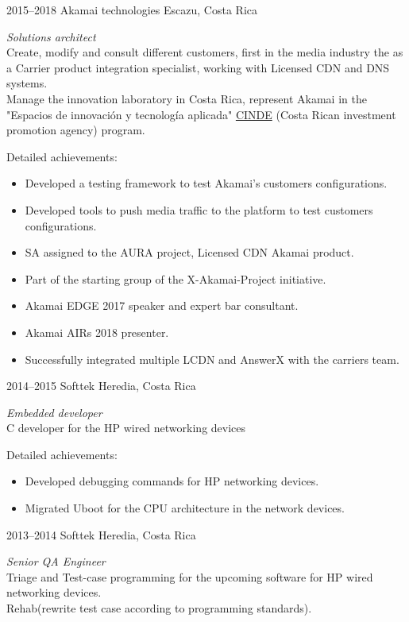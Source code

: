 \documentclass[]{friggeri-cv} %
\begin{document}
\begin{entrylist}

\entry
{2015--2018}
{Akamai technologies}
{Escazu, Costa Rica}
{\emph{Solutions architect} \\
Create, modify and consult different customers, first in the media industry the as a Carrier product integration specialist, working with Licensed CDN and DNS systems.\\
Manage the innovation laboratory in Costa Rica, represent Akamai in the "Espacios de innovación y tecnología aplicada" \href{https://www.cinde.org/}{CINDE} (Costa Rican investment promotion agency) program.

Detailed achievements:
\begin{itemize}
\item Developed a testing framework to test Akamai's customers configurations.
\item Developed tools to push media traffic to the platform to test customers configurations.
\item SA assigned to the AURA project, Licensed CDN Akamai product.
\item Part of the starting group of the X-Akamai-Project initiative.
\item Akamai EDGE 2017 speaker and expert bar consultant.
\item Akamai AIRs 2018 presenter.
\item Successfully integrated multiple LCDN and AnswerX with the carriers team.
\end{itemize}
}

\entry
{2014--2015}
{Softtek}
{Heredia, Costa Rica}
{\emph{Embedded developer} \\
C developer for the HP wired networking devices

Detailed achievements:
\begin{itemize}
\item Developed debugging commands for HP networking devices.
\item Migrated Uboot for the CPU architecture in the network devices.
\end{itemize}
}

\entry
{2013--2014}
{Softtek}
{Heredia, Costa Rica}
{\emph{Senior QA Engineer} \\
Triage and Test-case programming for the upcoming software for HP wired networking devices.\\
Rehab(rewrite test case according to programming standards).

}
\end{entrylist}
\end{document}
